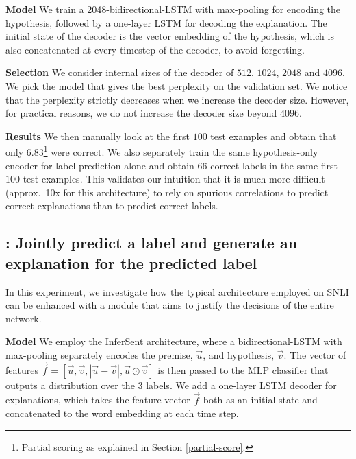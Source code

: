 \textbf{Model   } We train a 2048-bidirectional-LSTM with max-pooling for encoding the hypothesis, followed by a one-layer LSTM for decoding the explanation. The initial state of the decoder is the vector embedding of the hypothesis, which is also concatenated at every timestep of the decoder, to avoid forgetting. 


\textbf{Selection   } We consider internal sizes of the decoder of $512$, $1024$, $2048$ and $4096$. We pick the model that gives the best perplexity on the validation set. We notice that the perplexity strictly decreases when we increase the decoder size. However, for practical reasons, we do not increase the decoder size beyond $4096$.


\textbf{Results   } We then manually look at the first $100$ test examples and obtain that only $6.83$\footnote{Partial scoring as explained in Section \ref{partial-score}.} were correct. We also separately train the same hypothesis-only encoder for label prediction alone and obtain $66$ correct labels in the same first $100$ test examples. This validates our intuition that it is much more difficult (approx.\ 10x for this architecture) to rely on spurious correlations to predict correct explanations than to predict correct labels. 



\subsection{\expone: Jointly predict a label and generate an explanation for the predicted label}

In this experiment, we investigate how the typical architecture employed on SNLI can be enhanced with a module that aims to justify the decisions of the entire network. 


\textbf{Model   } We employ the InferSent \cite{infersent} architecture, where a bidirectional-LSTM with max-pooling separately encodes the premise, $\vec{u}$, and hypothesis, $\vec{v}$. The vector of features $\vec{f} = [\vec{u}, \vec{v}, |\vec{u} - \vec{v}|, \vec{u} \odot \vec{v}]$ is then passed to the MLP classifier that outputs a distribution over the 3 labels.  We add a one-layer LSTM decoder for explanations, which takes the feature vector $\vec{f}$ both as an initial state and concatenated to the word embedding at each time step.


